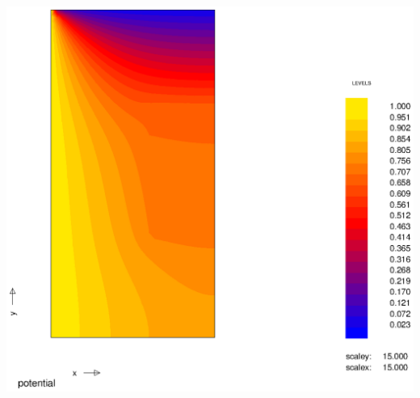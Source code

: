 \begin{Figure}
 \centerfloat
 \includegraphics[width=0.8\linewidth]{coef_10.eps}
 \label{fig:coef_10}
\end{Figure}